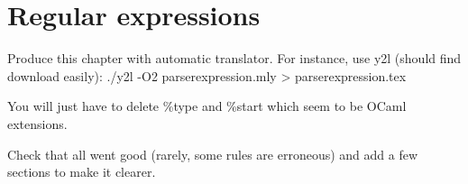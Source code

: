 \chapter{Regular expressions}

Produce this chapter with automatic translator. For instance, use y2l
(should find download easily):
./y2l -O2 parserexpression.mly > parserexpression.tex

You will just have to delete \%type and \%start which seem to be OCaml
extensions.

Check that all went good (rarely, some rules are erroneous) and add a
few sections to make it clearer.


